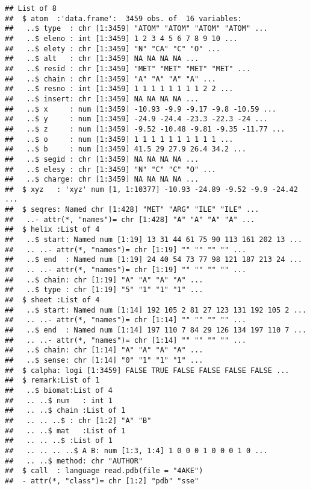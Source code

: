 \documentclass[]{article}
\newenvironment{Shaded}{\begin{snugshade}}{\end{snugshade}}
\newcommand{\NormalTok}[1]{#1}
\newcommand{\OperatorTok}[1]{\textcolor[rgb]{0.81,0.36,0.00}{\textbf{#1}}}
\begin{document}
\begin{verbatim}
## List of 8
##  $ atom  :'data.frame':  3459 obs. of  16 variables:
##   ..$ type  : chr [1:3459] "ATOM" "ATOM" "ATOM" "ATOM" ...
##   ..$ eleno : int [1:3459] 1 2 3 4 5 6 7 8 9 10 ...
##   ..$ elety : chr [1:3459] "N" "CA" "C" "O" ...
##   ..$ alt   : chr [1:3459] NA NA NA NA ...
##   ..$ resid : chr [1:3459] "MET" "MET" "MET" "MET" ...
##   ..$ chain : chr [1:3459] "A" "A" "A" "A" ...
##   ..$ resno : int [1:3459] 1 1 1 1 1 1 1 1 2 2 ...
##   ..$ insert: chr [1:3459] NA NA NA NA ...
##   ..$ x     : num [1:3459] -10.93 -9.9 -9.17 -9.8 -10.59 ...
##   ..$ y     : num [1:3459] -24.9 -24.4 -23.3 -22.3 -24 ...
##   ..$ z     : num [1:3459] -9.52 -10.48 -9.81 -9.35 -11.77 ...
##   ..$ o     : num [1:3459] 1 1 1 1 1 1 1 1 1 1 ...
##   ..$ b     : num [1:3459] 41.5 29 27.9 26.4 34.2 ...
##   ..$ segid : chr [1:3459] NA NA NA NA ...
##   ..$ elesy : chr [1:3459] "N" "C" "C" "O" ...
##   ..$ charge: chr [1:3459] NA NA NA NA ...
##  $ xyz   : 'xyz' num [1, 1:10377] -10.93 -24.89 -9.52 -9.9 -24.42 ...
##  $ seqres: Named chr [1:428] "MET" "ARG" "ILE" "ILE" ...
##   ..- attr(*, "names")= chr [1:428] "A" "A" "A" "A" ...
##  $ helix :List of 4
##   ..$ start: Named num [1:19] 13 31 44 61 75 90 113 161 202 13 ...
##   .. ..- attr(*, "names")= chr [1:19] "" "" "" "" ...
##   ..$ end  : Named num [1:19] 24 40 54 73 77 98 121 187 213 24 ...
##   .. ..- attr(*, "names")= chr [1:19] "" "" "" "" ...
##   ..$ chain: chr [1:19] "A" "A" "A" "A" ...
##   ..$ type : chr [1:19] "5" "1" "1" "1" ...
##  $ sheet :List of 4
##   ..$ start: Named num [1:14] 192 105 2 81 27 123 131 192 105 2 ...
##   .. ..- attr(*, "names")= chr [1:14] "" "" "" "" ...
##   ..$ end  : Named num [1:14] 197 110 7 84 29 126 134 197 110 7 ...
##   .. ..- attr(*, "names")= chr [1:14] "" "" "" "" ...
##   ..$ chain: chr [1:14] "A" "A" "A" "A" ...
##   ..$ sense: chr [1:14] "0" "1" "1" "1" ...
##  $ calpha: logi [1:3459] FALSE TRUE FALSE FALSE FALSE FALSE ...
##  $ remark:List of 1
##   ..$ biomat:List of 4
##   .. ..$ num   : int 1
##   .. ..$ chain :List of 1
##   .. .. ..$ : chr [1:2] "A" "B"
##   .. ..$ mat   :List of 1
##   .. .. ..$ :List of 1
##   .. .. .. ..$ A B: num [1:3, 1:4] 1 0 0 0 1 0 0 0 1 0 ...
##   .. ..$ method: chr "AUTHOR"
##  $ call  : language read.pdb(file = "4AKE")
##  - attr(*, "class")= chr [1:2] "pdb" "sse"
\end{verbatim}

\begin{Shaded}
\end{Shaded}
\end{document}
